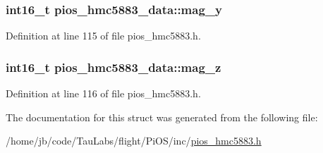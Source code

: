 \hypertarget{structpios__hmc5883__data_a707b18d498bd59bdee07421a6010c616}{
\subsubsection[{mag\-\_\-y}]{\setlength{\rightskip}{0pt plus 5cm}int16\-\_\-t {\bf pios\-\_\-hmc5883\-\_\-data\-::mag\-\_\-y}}}\label{structpios__hmc5883__data_a707b18d498bd59bdee07421a6010c616}


\-Definition at line 115 of file pios\-\_\-hmc5883.\-h.

\hypertarget{structpios__hmc5883__data_a03ffa9851eac28313edf9c6cc0a9cdd0}{
\subsubsection[{mag\-\_\-z}]{\setlength{\rightskip}{0pt plus 5cm}int16\-\_\-t {\bf pios\-\_\-hmc5883\-\_\-data\-::mag\-\_\-z}}}\label{structpios__hmc5883__data_a03ffa9851eac28313edf9c6cc0a9cdd0}


\-Definition at line 116 of file pios\-\_\-hmc5883.\-h.



\-The documentation for this struct was generated from the following file\-:\begin{DoxyCompactItemize}
\item 
/home/jb/code/\-Tau\-Labs/flight/\-Pi\-O\-S/inc/\hyperlink{pios__hmc5883_8h}{pios\-\_\-hmc5883.\-h}\end{DoxyCompactItemize}
